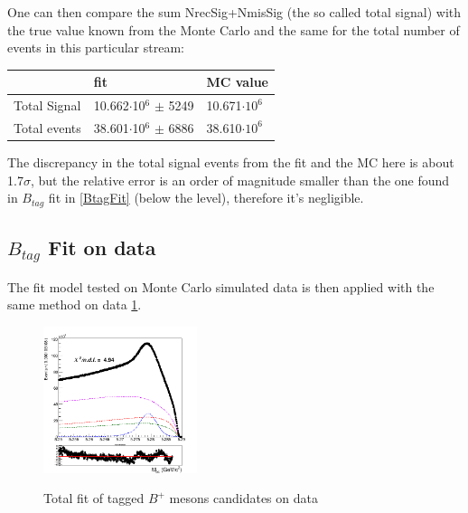 \vspace{0.5 cm}
\noindent  One can then compare the  sum  NrecSig+NmisSig (the so called total signal) with the true value known from the Monte Carlo and the same for the total number of events in this particular stream: \\


\begin{tabular}{ |P{3cm}||P{4cm}|P{2cm}|  }

\hline
      & fit & MC value\\
 \hline
 Total Signal  & 10.662$\cdot$10$^6$ $\pm$ 5249 & 10.671$\cdot 10^6$ \\
 Total events &  38.601$\cdot$10$^6$ $\pm$ 6886 & 38.610$\cdot 10^6$\\
 \hline
\end{tabular}
\vspace{0.75 cm}
\newline
\noindent The discrepancy in the total signal events from the fit and the MC here is about 1.7$\sigma$, but the relative error is an order of magnitude smaller than the one found in $B_{tag}$ fit in \ref{BtagFit} (below the \textperthousand level), therefore it's negligible.

\newpage

\subsection{$B_{tag}$ Fit on data}
The fit model tested on Monte Carlo simulated data is then applied with the same method on data \cref{fig:chargedControlD0Btag_Total_fit_onData}.

\begin{figure}[H]
\centering
{\includegraphics[width=0.40\textwidth]{05-chargedControlSample/figs/chargedBtag_Total_fit_onData_sigmaCB_free_370bins.png}}
\caption{Total fit of tagged $B^+$ mesons candidates on data}
\label{fig:chargedControlD0Btag_Total_fit_onData}
\end{figure}


